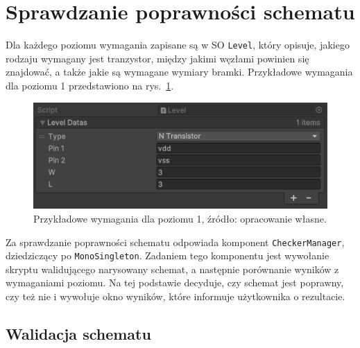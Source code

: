 \section{Sprawdzanie poprawności schematu}
\label{sec:sprawdzanie_poprawnosci_schematu}

Dla każdego poziomu wymagania zapisane są w SO \texttt{Level}, który opisuje,
jakiego rodzaju wymagany jest tranzystor,
między jakimi węzłami powinien się znajdować,
a także jakie są wymagane wymiary bramki.
Przykładowe wymagania dla poziomu 1 przedstawiono na rys.~\ref{fig:level1_requirements}.

\begin{figure}[h]
    \centering
    \includegraphics[width=.9\textwidth]{chapters/chapter4/rys/level}
    \caption[Przykładowe wymagania dla poziomu 1.]
    {Przykładowe wymagania dla poziomu 1, źródło: opracowanie własne.}
    \label{fig:level1_requirements}
\end{figure}

Za sprawdzanie poprawności schematu odpowiada komponent \texttt{CheckerManager}, dziedziczący po \texttt{MonoSingleton}.
Zadaniem tego komponentu jest wywołanie skryptu walidującego narysowany schemat,
a następnie porównanie wyników z wymaganiami poziomu.
Na tej podstawie decyduje, czy schemat jest poprawny, czy też nie\linebreak
i wywołuje okno wyników, które informuje użytkownika o rezultacie.

\subsection{Walidacja schematu}
\label{subsec:walidacja_schematu}

